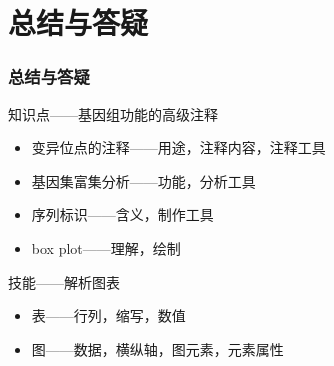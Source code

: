 \section{总结与答疑}
\begin{frame}
  \frametitle{总结与答疑}
  \begin{block}{知识点——基因组功能的高级注释}
    \begin{itemize}
      \item 变异位点的注释——用途，注释内容，注释工具
      \item 基因集富集分析——功能，分析工具
      \item 序列标识——含义，制作工具
      \item box plot——理解，绘制
    \end{itemize}
  \end{block}
  \begin{block}{技能——解析图表}
    \begin{itemize}
      \item 表——行列，缩写，数值
      \item 图——数据，横纵轴，图元素，元素属性
    \end{itemize}
  \end{block}
\end{frame}
